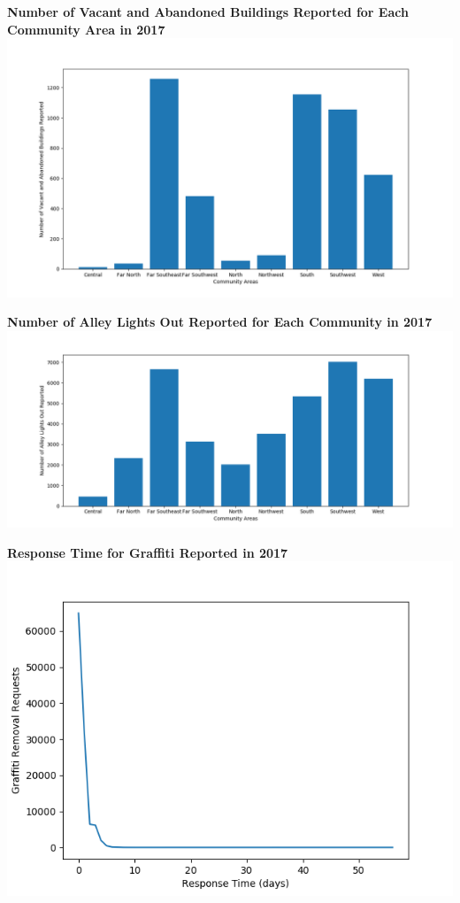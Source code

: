 \documentclass[letterpaper,12pt]{article}
\begin{document}
\noindent \textbf{Number of Vacant and Abandoned Buildings Reported for Each Community Area in 2017} \\
\includegraphics[scale=.6]{buildovercommunity.png}

\newpage

\noindent \textbf{Number of Alley Lights Out Reported for Each Community in 2017} \\
\includegraphics[scale=.6]{alleysovercommunity.png}

\noindent \textbf{Response Time for Graffiti Reported in 2017} \\
\includegraphics[scale=1]{responseovergraf.png}
\end{document}
